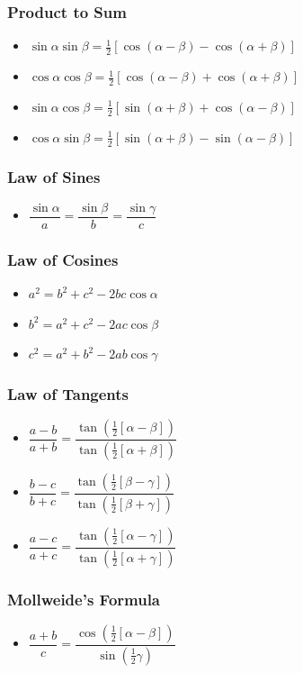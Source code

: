 \documentclass[]{report}
\newcommand \tab[1][1cm]{\hspace*{#1}}
\newcommand{\itemt}{\item \tab}
\begin{document}
\subsubsection{Product to Sum}
\begin{itemize}
\itemt \( \sin \alpha \sin \beta = \frac{1}{2} [\cos(\alpha-\beta)-\cos(\alpha+\beta)] \)
\itemt \( \cos \alpha \cos \beta = \frac{1}{2} [\cos(\alpha-\beta)+\cos(\alpha+\beta)] \)
\itemt \( \sin \alpha \cos \beta = \frac{1}{2} [\sin(\alpha+\beta)+\cos(\alpha-\beta)] \)
\itemt \( \cos \alpha \sin \beta = \frac{1}{2} [\sin(\alpha+\beta)-\sin(\alpha-\beta)] \)
\end{itemize}

\subsubsection{Law of Sines}
\begin{itemize}
\itemt \( \dfrac{\sin\alpha}{a} = \dfrac{\sin\beta}{b} = \dfrac{\sin\gamma}{c} \)
\end{itemize}

\subsubsection{Law of Cosines}
\begin{itemize}
\itemt \( a^2 = b^2 + c^2 - 2bc\cos\alpha \)
\itemt \( b^2 = a^2 + c^2 - 2ac\cos\beta \)
\itemt \( c^2 = a^2 + b^2 - 2ab\cos\gamma \)
\end{itemize}

\subsubsection{Law of Tangents}
\begin{itemize}
\itemt \( \dfrac{a-b}{a+b} = \dfrac{\tan(\frac{1}{2}[\alpha-\beta])}{\tan(\frac{1}{2}[\alpha+\beta])} \)
\itemt \( \dfrac{b-c}{b+c} = \dfrac{\tan(\frac{1}{2}[\beta-\gamma])}{\tan(\frac{1}{2}[\beta+\gamma])} \)
\itemt \( \dfrac{a-c}{a+c} = \dfrac{\tan(\frac{1}{2}[\alpha-\gamma])}{\tan(\frac{1}{2}[\alpha+\gamma])} \)
\end{itemize}

\subsubsection{Mollweide's Formula}
\begin{itemize}
\itemt \( \dfrac{a+b}{c} = \dfrac{\cos(\frac{1}{2}[\alpha-\beta])}{\sin(\frac{1}{2}\gamma)} \)
\end{itemize}
\end{document}
